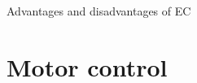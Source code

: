 \documentclass[compress]{beamer}
\begin{document}
{
\begin{frame}{Advantages and disadvantages of EC}

%
%
%
%
%

\end{frame}
}


\section{Motor control}
\end{document}
